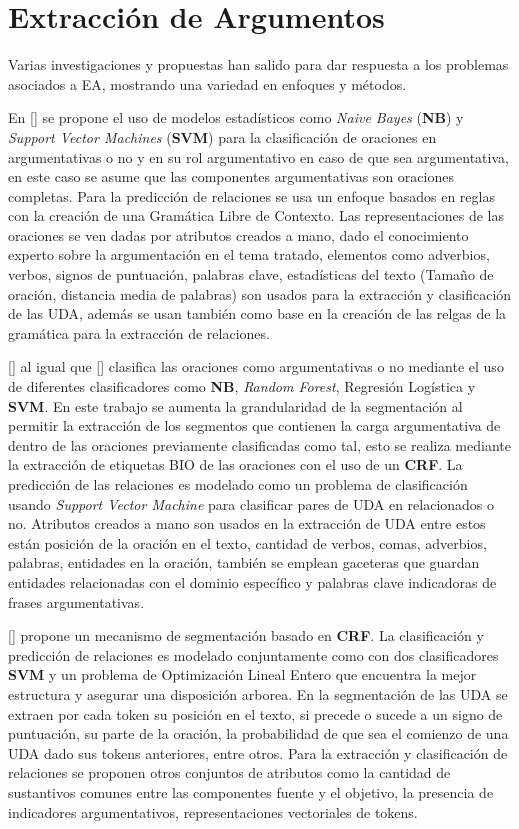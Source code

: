 \section{Extracción de Argumentos}

Varias investigaciones y propuestas han salido para dar respuesta a los problemas asociados a EA, mostrando
una variedad en enfoques y métodos.

En [\cite{palau2009argumentation}] se propone
el uso de modelos estadísticos como \emph{Naive Bayes} (\textbf{NB}) y \emph{Support Vector Machines} (\textbf{SVM}) 
para la clasificación de 
oraciones en argumentativas o no y en su rol argumentativo en caso de que sea argumentativa, en este
caso se asume que las componentes argumentativas son oraciones completas. Para la predicción de relaciones
se usa un enfoque basados en reglas con la creación de una Gramática Libre de Contexto. Las representaciones
de las oraciones se ven dadas por atributos creados a mano, dado el conocimiento experto sobre la argumentación
en el tema tratado, elementos como adverbios, verbos, signos de puntuación, palabras clave, estadísticas del texto
(Tamaño de oración, distancia media de palabras) son usados para la extracción y clasificación de las UDA, además
se usan también como base en la creación de las relgas de la gramática para la extracción de relaciones.

[\cite{goudas2015argument}] al igual que [\cite{palau2009argumentation}] clasifica las oraciones como
argumentativas o no mediante el uso de diferentes clasificadores como \textbf{NB}, \emph{Random Forest}, Regresión
Logística y \textbf{SVM}. En este trabajo se aumenta la grandularidad de la segmentación al permitir
la extracción de los segmentos que contienen la carga argumentativa de dentro de las oraciones previamente clasificadas
como tal, esto se realiza mediante la extracción de etiquetas BIO de las oraciones con el uso de un 
\textbf{CRF}. La predicción de las relaciones es modelado como un problema de clasificación
usando \emph{Support Vector Machine} para clasificar pares de UDA en relacionados o no. Atributos creados a mano 
son usados en la extracción de UDA entre estos están posición de la oración en el texto, cantidad de verbos, comas, adverbios,
palabras, entidades en la oración, también se emplean gaceteras que guardan entidades relacionadas con el dominio 
específico y palabras clave indicadoras de frases argumentativas. 

[\cite{stab2017parsing}] propone un mecanismo de segmentación basado en \textbf{CRF}. La clasificación
y predicción de relaciones es modelado conjuntamente como con dos clasificadores \textbf{SVM} y un problema
de Optimización Lineal Entero que encuentra la mejor estructura y asegurar una disposición arborea. En la segmentación
de las UDA se extraen por cada token su posición en el texto, si precede o sucede a un signo de puntuación, su parte de
la oración, la probabilidad de que sea el comienzo de una UDA dado sus tokens anteriores, entre otros. Para la extracción
y clasificación de relaciones se proponen otros conjuntos de atributos como la cantidad de sustantivos comunes entre
las componentes fuente y el objetivo, la presencia de indicadores argumentativos, representaciones vectoriales de tokens.

